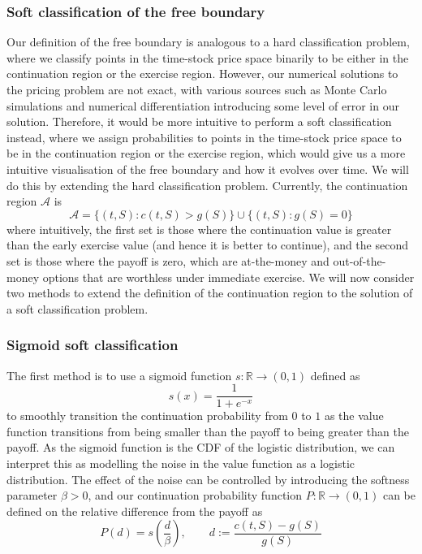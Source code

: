 \subsubsection{Soft classification of the free boundary}

Our definition of the free boundary is analogous to a hard classification problem, where we classify points in the time-stock price space binarily to be either in the continuation region or the exercise region. However, our numerical solutions to the pricing problem are not exact, with various sources such as Monte Carlo simulations and numerical differentiation introducing some level of error in our solution. Therefore, it would be more intuitive to perform a soft classification instead, where we assign probabilities to points in the time-stock price space to be in the continuation region or the exercise region, which would give us a more intuitive visualisation of the free boundary and how it evolves over time. We will do this by extending the hard classification problem. Currently, the continuation region $\mathcal A$ is
\begin{equation}
    \mathcal A = \{(t, S) : c(t, S) > g(S)\} \cup \{(t, S) : g(S) = 0\}
\end{equation}
where intuitively, the first set is those where the continuation value is greater than the early exercise value (and hence it is better to continue), and the second set is those where the payoff is zero, which are at-the-money and out-of-the-money options that are worthless under immediate exercise. We will now consider two methods to extend the definition of the continuation region to the solution of a soft classification problem.

\subsubsection{Sigmoid soft classification}

The first method is to use a sigmoid function $s: \mathbb R \to (0, 1)$ defined as
\begin{equation}
    s(x) = \frac{1}{1 + e^{-x}}
\end{equation}
to smoothly transition the continuation probability from $0$ to $1$ as the value function transitions from being smaller than the payoff to being greater than the payoff. As the sigmoid function is the CDF of the logistic distribution, we can interpret this as modelling the noise in the value function as a logistic distribution. The effect of the noise can be controlled by introducing the softness parameter $\beta > 0$, and our continuation probability function $P: \mathbb R \to (0, 1)$ can be defined on the relative difference from the payoff as
\begin{equation}
    P(d) = s\left(\frac d \beta\right),
    \qquad d := \frac{c(t, S) - g(S)}{g(S)}
\label{eq:continuation_probability_sigmoid}
\end{equation}

